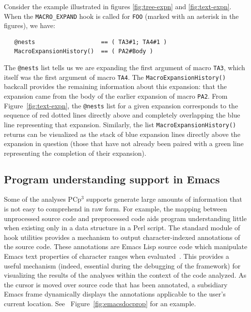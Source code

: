 \documentclass{article}
\newcommand{\pcp}{\mbox{\textsf{PCp}$^3$}}
\newcommand{\Perl}{\mbox{\textsf{Perl}}}
\newcommand{\figref}[1]{Figure~\ref{#1}}
\begin{document}
Consider the example illustrated in figures \ref{fig:tree-expn} and
\ref{fig:text-expn}.  When the \texttt{MACRO\_EXPAND} hook is called for
\texttt{FOO} (marked with an asterisk in the figures), we have:

\begin{verbatim}
   @nests                   == ( TA3#1; TA4#1 )
   MacroExpansionHistory()  == ( PA2#Body )
\end{verbatim}

\noindent The \texttt{@nests} list tells us we are expanding the first
argument of macro \texttt{TA3}, which itself was the first argument of
macro \texttt{TA4}.  The \texttt{MacroExpansionHistory()} backcall
provides the remaining information about this expansion: that the
expansion came from the body of the earlier expansion of macro
\texttt{PA2}.  From \figref{fig:text-expn}, the \texttt{@nests} list
for a given expansion corresponds to the sequence of red dotted lines
directly above and completely overlapping the blue line representing
that expansion.  Similarly, the list \texttt{MacroExpansionHistory()}
returns can be visualized as the stack of blue expansion
lines directly above the expansion in question (those that have not
already been paired with a green line representing the completion of
their expansion).

\subsection{Program understanding support in Emacs}
Some of the analyses \pcp{} supports generate large amounts of
information that is not easy to comprehend in raw form.  For example,
the mapping between unprocessed source code and preprocessed code aids
program understanding little when existing only in a data structure in a
\Perl{} script.  The standard module of hook utilities provides a
mechanism to output character-indexed annotations of the source code.
These annotations are Emacs Lisp source code which manipulate Emacs text
properties of character ranges when evaluated~\cite{GNUELisp}.  This
provides a useful mechanism (indeed, essential during the debugging of
the framework) for visualizing the results of the analyses within the
context of the code analyzed.  As the cursor is moved over source code
that has been annotated, a subsidiary Emacs frame dynamically displays
the annotations applicable to the user's current location. See
~\figref{fig:emacsdocprop} for an example.
\end{document}
